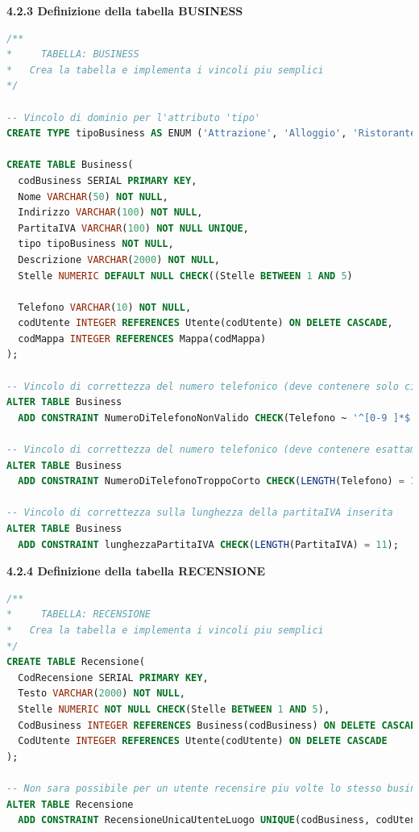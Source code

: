 \documentclass[a4paper,12pt]{article}
\begin{document}
\newpage\null{}\setcounter{page}{16}
\vspace{-2cm}
{\flushleft \bf 4.2.3  Definizione della tabella BUSINESS}
\begin{lstlisting}[language=SQL]
/**
*	  TABELLA: BUSINESS
*   Crea la tabella e implementa i vincoli piu semplici
*/

-- Vincolo di dominio per l'attributo 'tipo'
CREATE TYPE tipoBusiness AS ENUM ('Attrazione', 'Alloggio', 'Ristorante');

CREATE TABLE Business(
  codBusiness SERIAL PRIMARY KEY,
  Nome VARCHAR(50) NOT NULL,
  Indirizzo VARCHAR(100) NOT NULL,
  PartitaIVA VARCHAR(100) NOT NULL UNIQUE,
  tipo tipoBusiness NOT NULL,
  Descrizione VARCHAR(2000) NOT NULL,
  Stelle NUMERIC DEFAULT NULL CHECK((Stelle BETWEEN 1 AND 5) 
  									 									OR Stelle IS NULL),
  Telefono VARCHAR(10) NOT NULL,
  codUtente INTEGER REFERENCES Utente(codUtente) ON DELETE CASCADE,
  codMappa INTEGER REFERENCES Mappa(codMappa)
);

-- Vincolo di correttezza del numero telefonico (deve contenere solo cifre)
ALTER TABLE Business
  ADD CONSTRAINT NumeroDiTelefonoNonValido CHECK(Telefono ~ '^[0-9 ]*$');

-- Vincolo di correttezza del numero telefonico (deve contenere esattamente 10 cifre)
ALTER TABLE Business
  ADD CONSTRAINT NumeroDiTelefonoTroppoCorto CHECK(LENGTH(Telefono) = 10);

-- Vincolo di correttezza sulla lunghezza della partitaIVA inserita
ALTER TABLE Business
  ADD CONSTRAINT lunghezzaPartitaIVA CHECK(LENGTH(PartitaIVA) = 11);
\end{lstlisting}

\vspace*{+1cm}

{\flushleft \bf 4.2.4  Definizione della tabella RECENSIONE}
\begin{lstlisting}[language=SQL]
/**
*	  TABELLA: RECENSIONE
*   Crea la tabella e implementa i vincoli piu semplici
*/
CREATE TABLE Recensione(
  CodRecensione SERIAL PRIMARY KEY,
  Testo VARCHAR(2000) NOT NULL,
  Stelle NUMERIC NOT NULL CHECK(Stelle BETWEEN 1 AND 5),
  CodBusiness INTEGER REFERENCES Business(codBusiness) ON DELETE CASCADE,
  CodUtente INTEGER REFERENCES Utente(codUtente) ON DELETE CASCADE
);

-- Non sara possibile per un utente recensire piu volte lo stesso business
ALTER TABLE Recensione
  ADD CONSTRAINT RecensioneUnicaUtenteLuogo UNIQUE(codBusiness, codUtente);
\end{lstlisting}
\newpage
\end{document}
